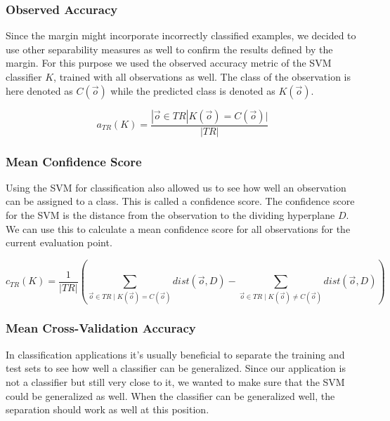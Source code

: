 \documentclass[pdftex,12pt,a4paper]{report}
\begin{document}
\subsubsection{Observed Accuracy}

Since the margin might incorporate incorrectly classified examples, we decided to use other separability measures
as well to confirm the results defined by the margin. For this purpose we used the observed accuracy metric of the SVM classifier $K$, trained with all observations as well. The class of the observation is here denoted as $C(\vec{o})$
while the predicted class is denoted as $K(\vec{o})$.

\begin{equation}
a_{TR}(K) = \frac{|\vec{o} \in TR | K(\vec{o}) = C(\vec{o})|}{|TR|}
\end{equation}

\subsubsection{Mean Confidence Score}
\label{subsub:mean-confidence-score}

Using the SVM for classification also allowed us to see how well an observation can be assigned to a class. This
is called a confidence score. The confidence score for the SVM is the distance from the observation to the dividing
hyperplane $D$. We can use this to calculate a mean confidence score for all observations for the current evaluation point.

\begin{equation}
c_{TR}(K) = \frac{1}{|TR|} (\sum_{\vec{o} \in TR \mid K(\vec{o}) = C(\vec{o})} dist(\vec{o}, D) - \sum_{\vec{o} \in TR \mid K(\vec{o}) \neq C(\vec{o})} dist(\vec{o}, D))
\end{equation}

\subsubsection{Mean Cross-Validation Accuracy}
\label{subsub:cross-validation-accuracy}

In classification applications it's usually beneficial to separate the training and test sets to see how well a
classifier can be generalized. Since our application is not a classifier but still very close to it, we wanted
to make sure that the SVM could be generalized as well. When the classifier can be generalized well, the separation
should work as well at this position.
\end{document}
